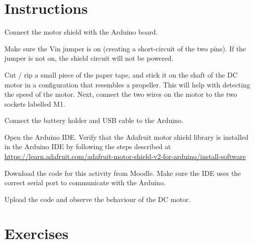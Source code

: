 \documentclass[12pt]{book}
\begin{document}



\section{Instructions}\label{ch5:instr}

\begin{compactitem}[--]
\item Connect the motor shield with the Arduino board.
\item Make sure the Vin jumper is on (creating a short-circuit of the
  two pins). If the jumper is not on, the shield circuit will not be
  powered. 
\item Cut / rip a small piece of the paper tape, and stick it on the
  shaft of the DC motor in a configuration that resembles a
  propeller. This will help with detecting the speed of the motor. Next,
  connect the two wires on the motor to the two 
  sockets labelled M1.
\item Connect the battery holder and USB cable to the Arduino.
\item Open the Arduino IDE. Verify that the Adafruit motor shield
  library is installed in 
  the Arduino IDE by following the steps described at 
  \url{https://learn.adafruit.com/adafruit-motor-shield-v2-for-arduino/install-software} 
\item Download the code for this activity from Moodle. Make sure the
  IDE uses the correct serial port to communicate with the Arduino.
\item Upload the code and observe the behaviour of the DC motor.
\end{compactitem}

\section{Exercises}
\end{document}

